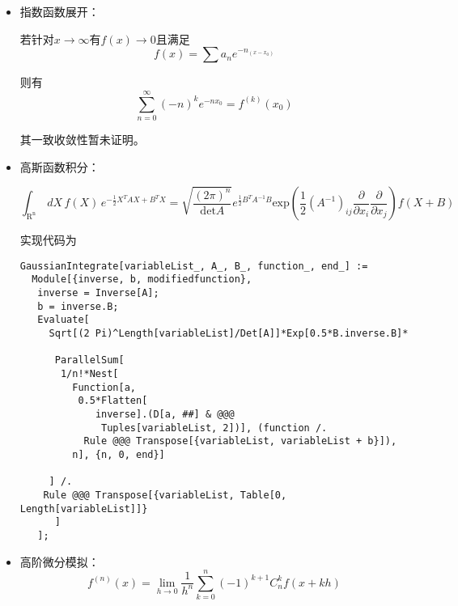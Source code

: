 \begin{itemize}
\item 指数函数展开：

若针对$x \rightarrow \infty$有$f(x) \rightarrow 0$且满足
\begin{equation}
f(x)=\sum a_n e^{-n_(x-x_0)}
\end{equation}

则有
\begin{equation}
\sum_{n=0}^{\infty}(-n)^k e^{-n x_0} = f^{(k)}(x_0)
\end{equation}

其一致收敛性暂未证明。

\item 高斯函数积分：

\begin{equation}
\int_\mathrm{R^n}\, dX \, f(X)\,e^{-\frac{1}{2}X^T A X + B^T X }= \sqrt{\frac{(2\pi)^n}{\mathrm{det} A}}e^{\frac{1}{2}B^T A^{-1}B} \mathrm{exp}\left(\frac{1}{2}(A^{-1})_{ij} \frac{\partial}{\partial x_i}\frac{\partial}{\partial x_j}\right) f(X+B)
\end{equation}

实现代码为
\begin{lstlisting}
GaussianIntegrate[variableList_, A_, B_, function_, end_] := 
  Module[{inverse, b, modifiedfunction},
   inverse = Inverse[A];
   b = inverse.B;
   Evaluate[
     Sqrt[(2 Pi)^Length[variableList]/Det[A]]*Exp[0.5*B.inverse.B]*
      
      ParallelSum[
       1/n!*Nest[
         Function[a, 
          0.5*Flatten[
             inverse].(D[a, ##] & @@@ 
              Tuples[variableList, 2])], (function /. 
           Rule @@@ Transpose[{variableList, variableList + b}]), 
         n], {n, 0, end}]
     
     ] /. 
    Rule @@@ Transpose[{variableList, Table[0, Length[variableList]]}
      ]
   ];
   \end{lstlisting}

   \item 高阶微分模拟：
   \begin{equation}
   f^(n) (x) = \lim_{h \rightarrow 0} \frac{1}{h^n} \sum_{k=0}^n (-1)^{k+1} C_n^k f(x+k h)
   \end{equation}
\end{itemize}
